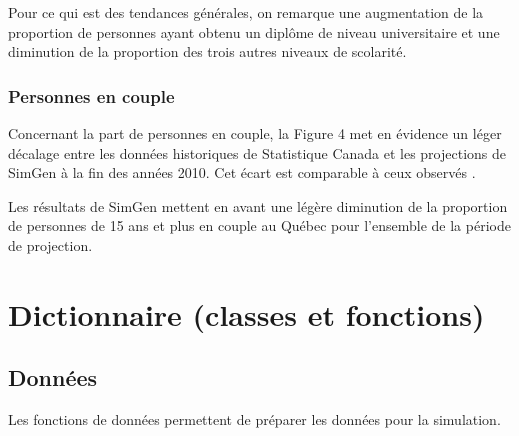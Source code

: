 \documentclass[letterpaper,10pt,french]{sphinxmanual}
\begin{document}
Pour ce qui est des tendances générales, on remarque une augmentation de la proportion de personnes ayant obtenu un diplôme de niveau universitaire et une diminution de la proportion des trois autres niveaux de scolarité.


\subsubsection{Personnes en couple}
\label{\detokenize{resultats:personnes-en-couple}}
\begin{figure}[htbp]
\centering

\noindent{}
\end{figure}

Concernant la part de personnes en couple, la Figure 4 met en évidence un léger décalage entre les données historiques de Statistique Canada et les projections de SimGen à la fin des années 2010. Cet écart est comparable à ceux observés .

Les résultats de SimGen mettent en avant une légère diminution de la proportion de personnes de 15 ans et plus en couple au Québec pour l’ensemble de la période de projection.


\section{Dictionnaire (classes et fonctions)}
\label{\detokenize{code:module-simgen}}\label{\detokenize{code:dictionnaire-classes-et-fonctions}}\label{\detokenize{code:code}}\label{\detokenize{code::doc}}

\subsection{Données}
\label{\detokenize{code:donnees}}
Les fonctions de données permettent de préparer les données pour la simulation.
\end{document}
